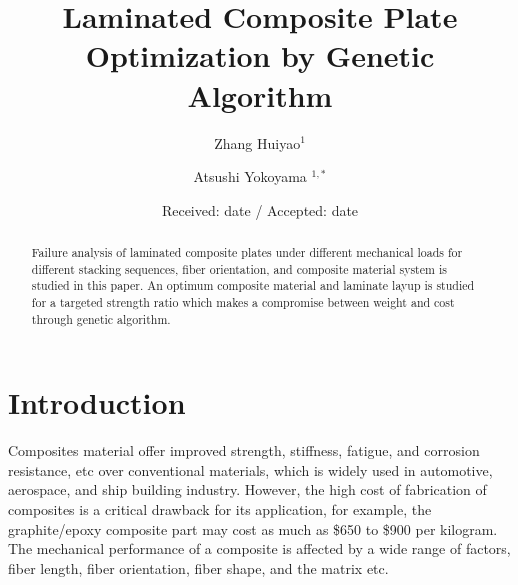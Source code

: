 \documentclass[smallextended]{svjour3}       %
\begin{document}
\title{Laminated Composite Plate Optimization by Genetic Algorithm}
\author{Zhang Huiyao$^1$  \and
	Atsushi Yokoyama $^{1,*}$
}
\date{Received: date / Accepted: date}
\maketitle

\begin{abstract}
Failure analysis of laminated composite plates under different mechanical loads for different
stacking sequences, fiber orientation, and composite material system is studied in this paper.
An optimum composite material and laminate layup is studied for a targeted strength ratio which
makes a compromise between weight and cost through genetic algorithm.


\end{abstract}



\section{Introduction}
Composites material offer improved strength, stiffness, fatigue, and corrosion resistance, etc over
conventional materials, which is widely used in automotive, aerospace, and ship building industry.
However, the high cost of fabrication of composites is a critical drawback for its application, for
example, the graphite/epoxy composite part may cost as much as \$650 to \$900 per kilogram.
The mechanical performance of a composite is affected by a wide range of factors, fiber length,
fiber orientation, fiber shape, and the matrix etc.
\end{document}
